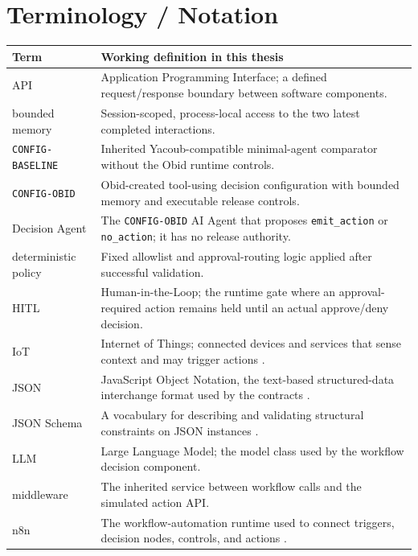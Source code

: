 \hypertarget{page.\thepage}{}
\section*{Terminology / Notation}\label{sec:terminology}
{}

\begingroup
\small
\renewcommand{\arraystretch}{0.92}
\begin{tabularx}{\textwidth}{@{}L{0.30\textwidth}Y@{}}
\toprule
\textbf{Term} & \textbf{Working definition in this thesis} \\
\midrule
API & Application Programming Interface; a defined request/response boundary between software components. \\
bounded memory & Session-scoped, process-local access to the two latest completed interactions. \\
\texttt{CONFIG-BASELINE} & Inherited Yacoub-compatible minimal-agent comparator without the Obid runtime controls. \\
\texttt{CONFIG-OBID} & Obid-created tool-using decision configuration with bounded memory and executable release controls. \\
Decision Agent & The \texttt{CONFIG-OBID} AI Agent that proposes \texttt{emit\_action} or \texttt{no\_action}; it has no release authority. \\
deterministic policy & Fixed allowlist and approval-routing logic applied after successful validation. \\
HITL & Human-in-the-Loop; the runtime gate where an approval-required action remains held until an actual approve/deny decision. \\
IoT & Internet of Things; connected devices and services that sense context and may trigger actions \cite{perera2014context}. \\
JSON & JavaScript Object Notation, the text-based structured-data interchange format used by the contracts \cite{bray2017json}. \\
JSON Schema & A vocabulary for describing and validating structural constraints on JSON instances \cite{wright2022jsonschemavalidation}. \\
LLM & Large Language Model; the model class used by the workflow decision component. \\
middleware & The inherited service between workflow calls and the simulated action API. \\
n8n & The workflow-automation runtime used to connect triggers, decision nodes, controls, and actions \cite{n8nCreateRunWorkflows}. \\

\end{tabularx}
